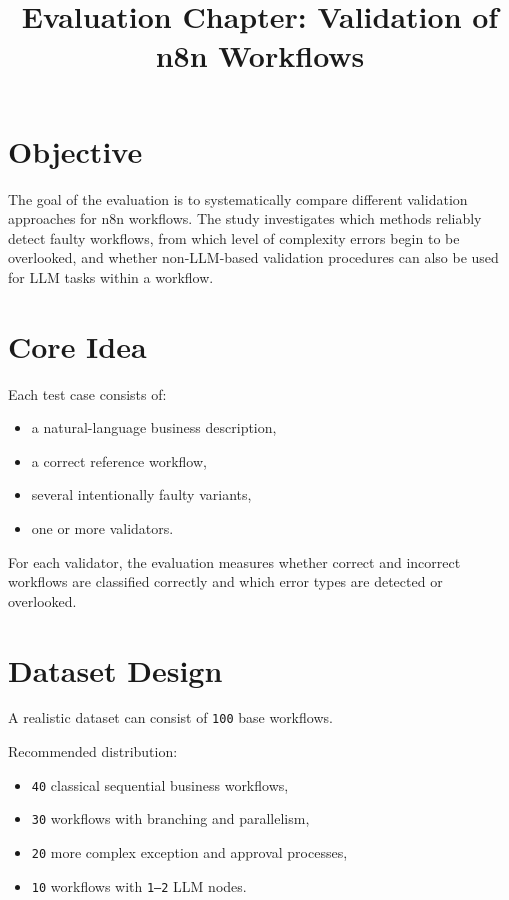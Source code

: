 \documentclass[12pt,a4paper]{article}
\title{Evaluation Chapter: Validation of n8n Workflows}
\author{}
\date{}
\begin{document}
\maketitle

\section{Objective}

The goal of the evaluation is to systematically compare different validation approaches for n8n workflows. The study investigates which methods reliably detect faulty workflows, from which level of complexity errors begin to be overlooked, and whether non-LLM-based validation procedures can also be used for LLM tasks within a workflow.

\section{Core Idea}

Each test case consists of:

\begin{itemize}
  \item a natural-language business description,
  \item a correct reference workflow,
  \item several intentionally faulty variants,
  \item one or more validators.
\end{itemize}

For each validator, the evaluation measures whether correct and incorrect workflows are classified correctly and which error types are detected or overlooked.

\section{Dataset Design}

A realistic dataset can consist of \texttt{100} base workflows.

Recommended distribution:

\begin{itemize}
  \item \texttt{40} classical sequential business workflows,
  \item \texttt{30} workflows with branching and parallelism,
  \item \texttt{20} more complex exception and approval processes,
  \item \texttt{10} workflows with \texttt{1--2} LLM nodes.
\end{itemize}
\end{document}
